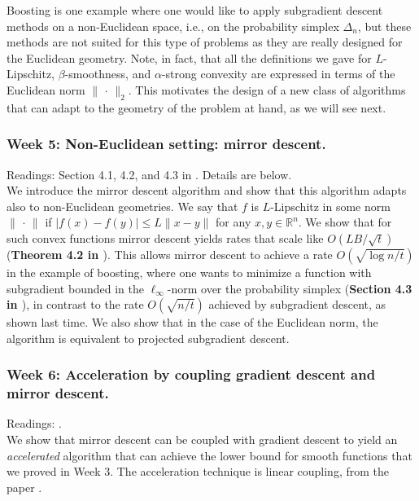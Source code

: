 Boosting is one example where one would like to apply subgradient descent methods on a non-Euclidean space, i.e., on the probability simplex $\Delta_n$, but these methods are not suited for this type of problems as they are really designed for the Euclidean geometry. Note, in fact, that all the definitions we gave for $L$-Lipschitz, $\beta$-smoothness, and $\alpha$-strong convexity are expressed in terms of the Euclidean norm $\|\,\cdot\,\|_2$. This motivates the design of a new class of algorithms that can adapt to the geometry of the problem at hand, as we will see next.

\subsubsection*{Week 5: Non-Euclidean setting: mirror descent.}
Readings: Section 4.1, 4.2, and 4.3 in \cite{bubeck}. Details are below.\\

We introduce the mirror descent algorithm and show that this algorithm adapts also to non-Euclidean geometries. We say that $f$ is $L$-Lipschitz in some norm $\|\,\cdot\,\|$ if $|f(x) - f(y)| \le L \| x - y \|$ for any $x,y\in\mathbb{R}^n$. We show that for such convex functions mirror descent yields rates that scale like $O(LB/\sqrt{t})$ (\textbf{Theorem 4.2 in \cite{bubeck}}). This allows mirror descent to achieve a rate $O(\sqrt{\log n/t})$ in the example of boosting, where one wants to minimize a function with subgradient bounded in the $\ell_\infty$-norm over the probability simplex (\textbf{Section 4.3 in \cite{bubeck}}), in contrast to the rate $O(\sqrt{n/t})$ achieved by subgradient descent, as shown last time. We also show that in the case of the Euclidean norm, the algorithm is equivalent to projected subgradient descent.

\subsubsection*{Week 6: Acceleration by coupling gradient descent and mirror descent.}
Readings: \cite{linearcoupling}.\\

We show that mirror descent can be coupled with gradient descent to yield an \emph{accelerated} algorithm that can achieve the lower bound for smooth functions that we proved in Week 3. The acceleration technique is linear coupling, from the paper \cite{linearcoupling}.

